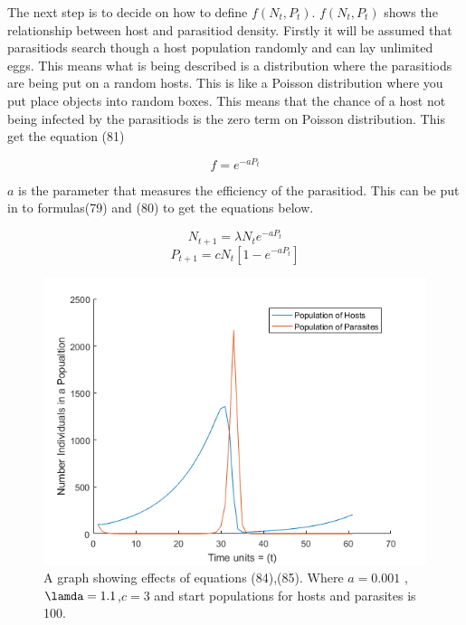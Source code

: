 \documentclass[final]{cmpreport}
\begin{document}
	 
	 The next step is to decide on how to define $f(N_t,P_t)$. $f(N_t,P_t)$ shows the relationship between host and parasitiod density. Firstly it will be assumed that parasitiods search though a host population randomly and can lay unlimited eggs. This means what is being described is a distribution where the parasitiods are being put on a random hosts. This is like a Poisson distribution where you put place objects into random boxes. This means that the chance of a host not being infected by the parasitiods is the zero term on Poisson distribution. This get the equation (81)
	 
	\begin{equation} f=e^{-aP_t} \end{equation} 
	
	$a$ is the parameter that measures the efficiency of the parasitiod. This can be put in to formulas(79) and (80) to get the equations below.
	
	\begin{equation} N_{t+1}=\lambda N_te^{-aP_t} \end{equation} 
	\begin{equation} P_{t+1}=cN_t[1-e^{-aP_t}] \end{equation} 
	
	
	\begin{figure}[h!] 
		\includegraphics[width=\textwidth]{hostParasite.png} 
		\caption{ A graph showing effects of equations (84),(85). Where $a=0.001$ , $ \lamda =1.1$,$c=3$ and start populations for hosts and parasites is 100. }
			
	\end{figure}
\end{document}
